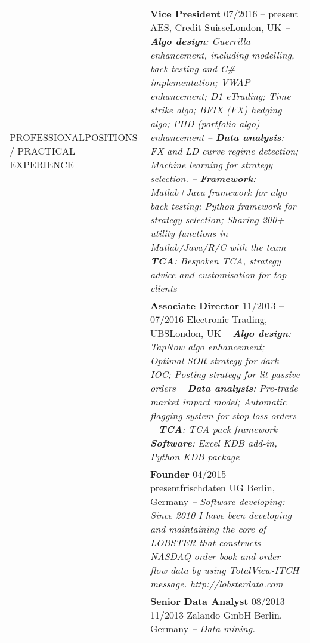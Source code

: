 \documentclass[a4paper,10pt]{article}
\begin{document}
\begin{longtable}[h]{p{}p{}}
  PROFESSIONAL\newline POSITIONS / \newline PRACTICAL \newline EXPERIENCE 
  & \textbf{Vice President} \hfill 07/2016 -- present \newline AES, Credit-Suisse\hfill London, UK\newline  
    \emph{-- \textbf{Algo design}: Guerrilla enhancement, including modelling, back testing and C\# implementation; VWAP enhancement; D1 eTrading; Time strike algo; BFIX (FX) hedging algo; PHD (portfolio algo) enhancement}\newline 
    \emph{-- \textbf{Data analysis}: FX and LD curve regime detection; Machine learning for strategy selection.}\newline 
    \emph{-- \textbf{Framework}: Matlab+Java framework for algo back testing; Python framework for strategy selection; Sharing 200+ utility functions in Matlab/Java/R/C with the team}\newline 
  \emph{-- \textbf{TCA}: Bespoken TCA, strategy advice and customisation for top clients}\\ 
  & \textbf{Associate Director} \hfill 11/2013 -- 07/2016 \newline Electronic Trading, UBS\hfill London, UK\newline  
    \emph{-- \textbf{Algo design}: TapNow algo enhancement; Optimal SOR strategy for dark IOC; Posting strategy for lit passive orders} \newline
    \emph{-- \textbf{Data analysis}: Pre-trade market impact model; Automatic flagging system for stop-loss orders}\newline
  \emph{-- \textbf{TCA}: TCA pack framework} \newline
  \emph{-- \textbf{Software}: Excel KDB add-in, Python KDB package}\\
  & \textbf{Founder} \hfill 04/2015 -- present\newline frischdaten UG \hfill Berlin, Germany \newline  
  \emph{-- Software developing: Since 2010 I have been developing and maintaining the core of LOBSTER that constructs NASDAQ order book and order flow data by using TotalView-ITCH message. http://lobsterdata.com } \\
  & \textbf{Senior Data Analyst} \hfill 08/2013 -- 11/2013 \newline Zalando GmbH \hfill Berlin, Germany \newline  \emph{-- Data mining.} \\

\end{longtable}
\end{document}
